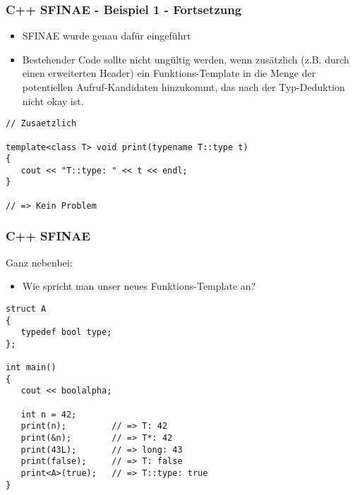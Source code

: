 \documentclass{beamer}
\begin{document}
\begin{frame}[fragile]
\frametitle{C++ SFINAE - Beispiel 1 - Fortsetzung}

\begin{itemize}
\item SFINAE wurde genau dafür eingeführt
\item Bestehender Code sollte nicht ungültig werden, wenn zusätzlich (z.B. durch einen erweiterten Header) ein Funktions-Template in die Menge der potentiellen Aufruf-Kandidaten hinzukommt, das nach der Typ-Deduktion nicht \glqq{}okay\grqq{} ist.
\end{itemize}

\begin{lstlisting}
// Zusaetzlich

template<class T> void print(typename T::type t)
{
   cout << "T::type: " << t << endl;
}

// => Kein Problem
\end{lstlisting}

\end{frame}


\begin{frame}[fragile]
\frametitle{C++ SFINAE}
Ganz nebenbei:

\begin{itemize}
\item Wie spricht man unser neues Funktions-Template an?
\end{itemize}

\begin{lstlisting}
struct A
{
   typedef bool type;
};

int main()
{
   cout << boolalpha;

   int n = 42;
   print(n);         // => T: 42
   print(&n);        // => T*: 42
   print(43L);       // => long: 43
   print(false);     // => T: false
   print<A>(true);   // => T::type: true
}
\end{lstlisting}

\end{frame}
\end{document}
